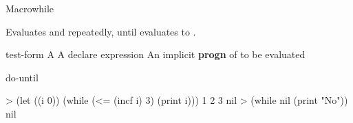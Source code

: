 \documentclass[10pt,twoside,english,pdftex]{article}
\begin{document}

\begin{functiondoc}{Macro}{while}{ 
    \superstar{}
    \superstar}
%
  
\fnsyntax

\fnpurpose Evaluates  and  repeatedly,
until  evaluates to \nil.

\fnpackage {}

\fnmodule {}

\fnargs
\begin{args}{test-form}
 A 
\arg[declaration] A declare expression
\arg[forms] An implicit \textbf{progn} of  to be evaluated
\end{args}

\begin{alsos}{do-until}
\also[do-until]
\also[until]
\end{alsos}

\fnexamples
\begin{example}
> (let ((i 0)) 
    (while (<= (incf i) 3) 
       (print i)))
1 
2 
3 
nil
> (while nil (print "No"))
nil
\end{example}

\end{functiondoc}

\end{document}
